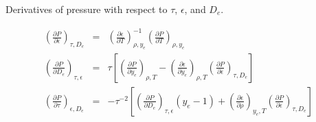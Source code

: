 Derivatives of pressure with respect to $\tau$, $\epsilon$, and $D_{e}$. \\
\begin{footnotesize}
\begin{eqnarray}
	\left(\frac{\partial{P}}{\partial{\epsilon}}\right)_{\tau,D_{e}} &=& \left(\frac{\partial{\epsilon}}{\partial{T}}\right)^{-1}_{\rho, y_{e}}\left(\frac{\partial{P}}{\partial{T}}\right)_{\rho, y_{e}} \\
	\left(\frac{\partial{P}}{\partial{D_{e}}}\right)_{\tau, \epsilon} &=& \tau \left[
					\left(\frac{\partial{P}}{\partial{y_e}}\right)_{\rho, T} -
          \left(\frac{\partial{\epsilon}}{\partial{y_e}}\right)_{\rho, T}
					\left(\frac{\partial{P}}{\partial{\epsilon}}\right)_{\tau, D_{e}}\right]\\
	\left(\frac{\partial{P}}{\partial{\tau}}\right)_{\epsilon, D_{e}} &=& -\tau^{-2}
					\left[ \left(\frac{\partial{P}}{\partial{D_{e}}}\right)_{\tau, \epsilon}
					(y_e - 1) + \left( \frac{\partial{\epsilon}}{\partial{\rho}} \right)_{y_{e}, T}
          \left(\frac{\partial{P}}{\partial{\epsilon}}\right)_{\tau, D_{e}}\right]
\end{eqnarray}
\end{footnotesize}
